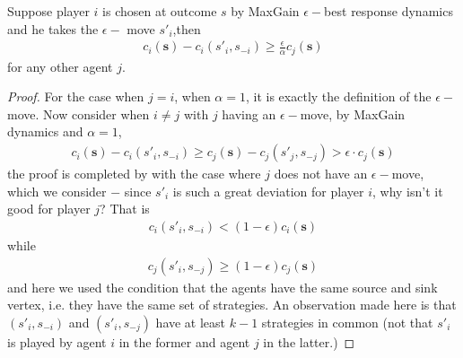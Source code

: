 \begin{lemma}
Suppose player $i$ is chosen at outcome $s$ by MaxGain $\epsilon-$best response dynamics and he takes the $\epsilon-$ move $s'_i$,then
\begin{align}
c_i(\mathbf{s})-c_i(s'_i,s_{-i})\geq \frac{\epsilon}{\alpha}c_j(\mathbf{s})\label{eq:costofdevplayer}
\end{align}
for any other agent $j$.
\label{lemma:costofdevplayer}
\begin{proof}
For the case when $j=i$, when $\alpha=1$, it is exactly the definition of the $\epsilon-$move. Now consider when $i \neq j$ with $j$ having an $\epsilon-$move, by MaxGain dynamics and $\alpha=1$,
\begin{align*}
c_i(\mathbf{s})-c_i(s'_i,s_{-i})\geq c_j(\mathbf{s})-c_j(s'_j,s_{-j})>\epsilon\cdot c_j(\mathbf{s})
\end{align*}
the proof is completed by with the case where $j$ does not have an $\epsilon-$move, which we consider $-$ since $s'_i$ is such a great deviation for player $i$, why isn't it good for player $j$? That is 
\begin{align*}
c_i(s'_i,s_{-i})<(1-\epsilon)c_i(\mathbf{s})
\end{align*}
while
\begin{align*}
c_j(s'_i,s_{-j})\geq(1-\epsilon)c_j(\mathbf{s})
\end{align*}
and here we used the condition that the agents have the same source and sink vertex, i.e. they have the same set of strategies. An observation made here is that $(s'_i,s_{-i})$ and $(s'_i,s_{-j})$ have at least $k-1$ strategies in common (not that $s'_i$ is played by agent $i$ in the former and agent $j$ in the latter.)
\end{proof}
\end{lemma}




